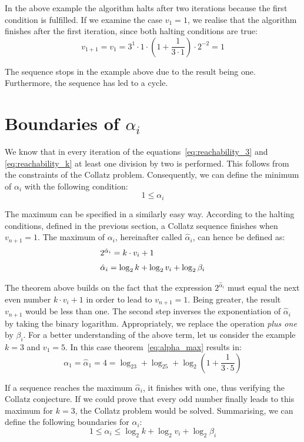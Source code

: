 \documentclass{SciPress_2015}
\begin{document}
In the above example the algorithm halts after two iterations because the first condition is fulfilled. If we examine the case $v_1=1$, we realise that the algorithm finishes after the first iteration, since both halting conditions are true:
\[
v_{1+1}=v_1=3^1\cdot 1\cdot\left(1+\frac{1}{3\cdot1}\right)\cdot2^{-2}=1
\]

The sequence stops in the example above due to the result being one. Furthermore, the sequence has led to a cycle.

\section{Boundaries of \boldmath$\alpha_i$}
We know that in every iteration of the equations~\ref{eq:reachability_3} and \ref{eq:reachability_k} at least one division by two is performed. This follows from the constraints of the Collatz problem. Consequently, we can define the minimum of $\alpha_i$ with the following condition:
\[
1\le\alpha_i
\]

The maximum can be specified in a similarly easy way. According to the halting conditions, defined in the previous section, a Collatz sequence finishes when $v_{n+1}=1$. The maximum of $\alpha_i$, hereinafter called $\hat\alpha_i$, can hence be defined as:
\begin{equation}
\label{eq:alpha_max}
\begin{array}{l}
2^{\hat\alpha_i}=k\cdot v_i+1\\[\medskipamount]
\hat\alpha_i=\log_2k+\log_2v_i+\log_2\beta_i
\end{array}	
\end{equation}

The theorem above builds on the fact that the expression $2^{\hat\alpha_i}$ must equal the next even number $k\cdot v_i+1$ in order to lead to $v_{n+1}=1$. Being greater, the result $v_{n+1}$ would be less than one. The second step inverses the exponentiation of $\hat\alpha_i$ by taking the binary logarithm. Appropriately, we replace the operation \textit{plus one} by $\beta_i$. For a better understanding of the above term, let us consider the example $k=3$ and $v_1=5$. In this case theorem~\ref{eq:alpha_max} results in:
\[
\alpha_1=\hat\alpha_1=4=\log_23+\log_25+\log_2\left(1+\frac{1}{3\cdot5}\right)
\]

If a sequence reaches the maximum $\hat\alpha_i$, it finishes with one, thus verifying the Collatz conjecture. If we could prove that every odd number finally leads to this maximum for $k=3$, the Collatz problem would be solved. Summarising, we can define the following boundaries for $\alpha_i$:
\begin{equation}
\label{eq:boundary_alpha_i}
1\le\alpha_i\le\log_2k+\log_2v_i+\log_2\beta_i
\end{equation}
\end{document}
